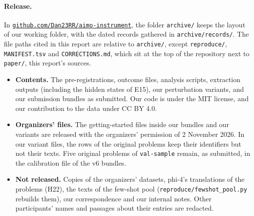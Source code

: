 \paragraph{Release.} In \href{https://github.com/Dan23RR/aimo-instrument}{\nolinkurl{github.com/Dan23RR/aimo-instrument}}, the folder \texttt{archive/} keeps the layout of our working folder, with the dated records gathered in \texttt{archive/records/}. The file paths cited in this report are relative to \texttt{archive/}, except \texttt{reproduce/}, \texttt{MANIFEST.tsv} and \texttt{CORRECTIONS.md}, which sit at the top of the repository next to \texttt{paper/}, this report's sources.
\begin{itemize}
\item \textbf{Contents.} The pre-registrations, outcome files, analysis scripts, extraction outputs (including the hidden states of E15), our perturbation variants, and our submission bundles as submitted. Our code is under the MIT license, and our contribution to the data under CC BY 4.0.
\item \textbf{Organizers' files.} The getting-started files inside our bundles and our variants are released with the organizers' permission of 2 November 2026. In our variant files, the rows of the original problems keep their identifiers but not their texts. Five original problems of \texttt{val-sample} remain, as submitted, in the calibration file of the v6 bundles.
\item \textbf{Not released.} Copies of the organizers' datasets, phi-4's translations of the problems (H22), the texts of the few-shot pool (\texttt{reproduce/fewshot\_pool.py} rebuilds them), our correspondence and our internal notes. Other participants' names and passages about their entries are redacted.
\end{itemize}

